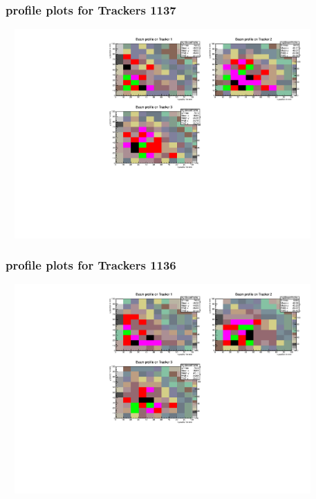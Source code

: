 \documentclass[slidestop,compress,mathserif]{beamer}
\begin{document}
\begin{frame}\frametitle{profile plots for Trackers 1137}
	 \includegraphics[width=12cm,height=8cm]{profile_plots_for_Trackers_1137.pdf}
\end{frame}
\begin{frame}\frametitle{profile plots for Trackers 1136}
	 \includegraphics[width=12cm,height=8cm]{profile_plots_for_Trackers_1136.pdf}
\end{frame}
\end{document}
